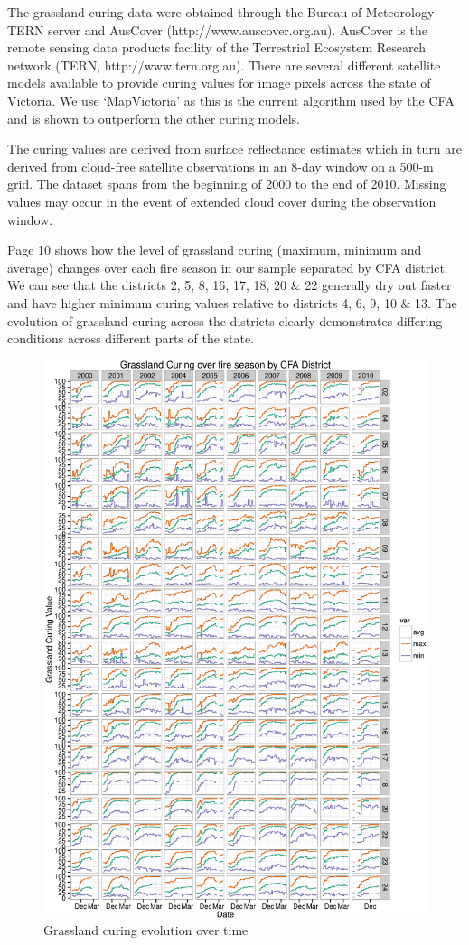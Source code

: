 \documentclass[11pt,a4paper]{article}
\begin{document}
The grassland curing data were obtained through the Bureau of Meteorology TERN server and AusCover (http://www.auscover.org.au). AusCover is the remote sensing data products facility of the Terrestrial Ecosystem Research network (TERN, http://www.tern.org.au). There are several different satellite models available to provide curing values for image pixels across the state of Victoria. We use `MapVictoria' \citep{martin15} as this is the current algorithm used by the CFA and is shown to outperform the other curing models.

The curing values are derived from surface reflectance estimates which in turn are derived from cloud-free satellite observations in an 8-day window on a 500-m grid. The dataset spans from the beginning of 2000 to the end of 2010. Missing values may occur in the event of extended cloud cover during the observation window.

Page 10 shows how the level of grassland curing (maximum, minimum and average) changes over each fire season in our sample separated by CFA district. We can see that the districts 2, 5, 8, 16, 17, 18, 20 \&  22 generally dry out faster and have higher minimum curing values relative to districts 4, 6, 9, 10 \& 13. The evolution of grassland curing across the districts clearly demonstrates differing conditions across different parts of the state.


\begin{figure}[p]\centering
\includegraphics[width=.95\textwidth]{figures/curdist.pdf}
  \caption{Grassland curing evolution over time }
  \label{fig:cur_evol}
\end{figure}
\end{document}

